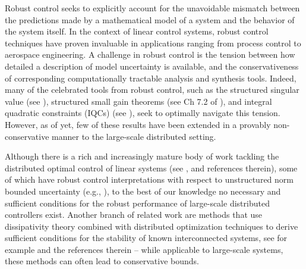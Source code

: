 Robust control seeks to explicitly account for the unavoidable mismatch between the predictions made by a mathematical model of a system and the behavior of the system itself.  In the context of linear control systems, robust control techniques \cite{khammash1990stability,dahleh1994control,zhou1996robust} have proven invaluable in applications ranging from process control to aerospace engineering.  A challenge in robust control is the tension between how detailed a description of model uncertainty is available, and the conservativeness of corresponding computationally tractable analysis and synthesis tools.  Indeed, many of the celebrated tools from robust control, such as the structured singular value (see \cite{packard1993complex}), structured small gain theorems (see Ch 7.2 of \cite{dahleh1994control}), and integral quadratic constraints (IQCs) (see \cite{megretski1997system}), seek to optimally navigate this tension.  However, as of yet, few of these results have been extended in a provably non-conservative manner to the large-scale distributed setting.

Although there is a rich and increasingly mature body of work tackling the distributed optimal control of linear systems (see \cite{2006_Rotkowitz_QI_TAC, 2012_Mahajan_Info_survey, wang2019system,zheng2019equivalence}, and references therein), some of which have robust control interpretations with respect to unstructured norm bounded uncertainty (e.g., \cite{langbort2004distributed,matni2014distributed,lessard2014state,rosinger2017structured,ahmadi2018distributed}), to the best of our knowledge no necessary and sufficient conditions for the robust performance of large-scale distributed controllers exist.  Another branch of related work are methods that use dissipativity theory combined with distributed optimization techniques to derive sufficient conditions for the stability of known interconnected systems, see for example \cite{arcak2016networks,meissen2015compositional,anderson2011dynamical} and the references therein -- while applicable to large-scale systems, these methods can often lead to conservative bounds.


